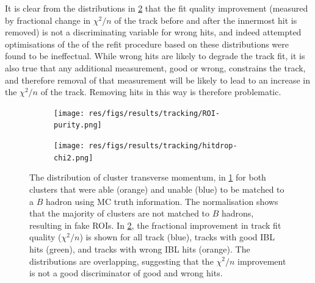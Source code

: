 It is clear from the distributions in \cref{fig:refit chi2 dists} that the fit quality improvement (measured by fractional change in $\chi^2/n$ of the track before and after the innermost hit is removed) is not a discriminating variable for wrong hits, and indeed attempted optimisations of the of the refit procedure based on these distributions were found to be ineffectual. While wrong hits are likely to degrade the track fit, it is also true that any additional measurement, good or wrong, constrains the track, and therefore removal of that measurement will be likely to lead to an increase in the $\chi^2/n$ of the track. Removing hits in this way is therefore problematic.
%
\begin{figure}[!htbp]
    \centering
    \begin{subfigure}{.5\textwidth}
      \centering
      \texttt{[image: res/figs/results/tracking/ROI-purity.png]}
      \caption{}
      \label{fig:cluster purity in pt}
    \end{subfigure}%
    \begin{subfigure}{.5\textwidth}
      \centering
      \texttt{[image: res/figs/results/tracking/hitdrop-chi2.png]}
      \caption{}
      \label{fig:refit chi2 dists}
    \end{subfigure}
    \caption{The distribution of cluster transverse momentum, in \cref{fig:cluster purity in pt} for both clusters that were able (orange) and unable (blue) to be matched to a $B$ hadron using MC truth information. The normalisation shows that the majority of clusters are not matched to $B$ hadrons, resulting in fake ROIs. In \cref{fig:refit chi2 dists}, the fractional improvement in track fit quality ($\chi^2/n$) is shown for all track (blue), tracks with good IBL hits (green), and tracks with wrong IBL hits (orange). The distributions are overlapping, suggesting that the $\chi^2/n$ improvement is not a good discriminator of good and wrong hits.}
    \label{fig:cluster chi2 info}
\end{figure}
%

